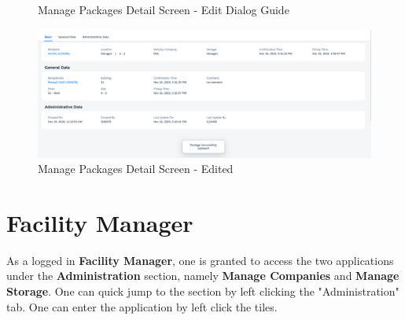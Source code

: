 \begin{figure}[H]
    \hspace{5pt}
    \caption{Manage Packages Detail Screen - Edit Dialog Guide}
	\label{fig:MPDetailEditBtn}
\end{figure}


\begin{figure}[H]
	\centering
	\includegraphics[width=1\linewidth]{images/user_doc/managePack/DetailScreen/edit/editToast.png}
	\caption{Manage Packages Detail Screen - Edited}
	\label{fig:MPReportEditDone}
\end{figure}

\pagebreak

\section{Facility Manager}

As a logged in \textbf{Facility Manager}, one is granted to access the two applications under the \textbf{Administration} section, namely \textbf{Manage Companies} and \textbf{Manage Storage}. One can quick jump to the section by left clicking the "Administration" tab. One can enter the application by left click the tiles.

